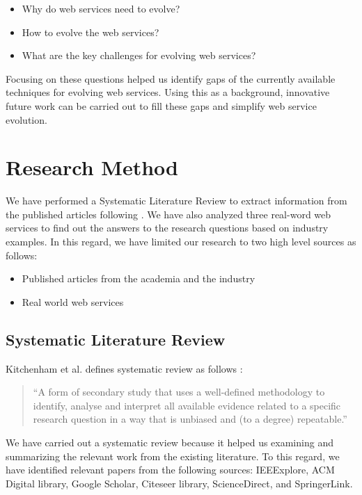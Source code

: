 \documentclass[runningheads,a4paper]{llncs}
\begin{document}
\begin{itemize}
  \item Why do web services need to evolve?
  \item How to evolve the web services?
  \item What are the key challenges for evolving web services?
\end{itemize}

Focusing on these questions helped us identify gaps of the currently available techniques for evolving web services. Using this as a background, innovative future work can be carried out to fill these gaps and simplify web service evolution.

\section{Research Method} %
\label{sec:research_method}

We have performed a Systematic Literature Review to extract information from the published articles following \cite{kitchenham2007guidelines}. We have also analyzed three real-word web services to find out the answers to the research questions based on industry examples.
In this regard, we have limited our research to two high level sources as follows:

\begin{itemize}
  \item Published articles from the academia and the industry
  \item Real world web services
\end{itemize}

\subsection{Systematic Literature Review} %
\label{sub:systematic_literature_review}
Kitchenham et al. defines systematic review as follows \cite{kitchenham2007guidelines}:

\begin{quote}
``A form of secondary study that uses a well-defined methodology to identify, analyse and interpret all available evidence related to a specific research question in a way that is unbiased and (to a degree) repeatable.''
\end{quote}
We have carried out a systematic review because it helped us examining and summarizing the relevant work from the existing literature. To this regard, we have identified relevant papers from the following sources: IEEExplore, ACM Digital library, Google Scholar, Citeseer library, ScienceDirect, and SpringerLink.
\end{document}
